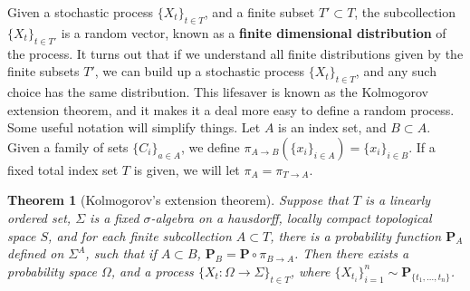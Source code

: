\documentclass[12pt]{report}
\theoremstyle{plain}
\newtheorem{theorem}{Theorem}[chapter]
\theoremstyle{definition}
\begin{document}
Given a stochastic process $\{X_t\}_{t \in T}$, and a finite subset $T' \subset T$, the subcollection $\{X_t\}_{t \in T'}$ is a random vector, known as a {\bf finite dimensional distribution} of the process. It turns out that if we understand all finite distributions given by the finite subsets $T'$, we can build up a stochastic process $\{X_t\}_{t \in T}$, and any such choice has the same distribution. This lifesaver is known as the Kolmogorov extension theorem, and it makes it a deal more easy to define a random process. Some useful notation will simplify things. Let $A$ is an index set, and $B \subset A$. Given a family of sets $\{ C_i \}_{a \in A}$, we define $\pi_{A \to B}(\{x_i\}_{i \in A}) = \{x_i\}_{i \in B}$. If a fixed total index set $T$ is given, we will let $\pi_A = \pi_{T \to A}$.

\begin{theorem}[Kolmogorov's extension theorem]
    Suppose that $T$ is a linearly ordered set, $\Sigma$ is a fixed $\sigma$-algebra on a hausdorff, locally compact topological space $S$, and for each finite subcollection $A \subset T$, there is a probability function $\mathbf{P}_{A}$ defined on $\Sigma^{A}$, such that if $A \subset B$, $\mathbf{P}_B = \mathbf{P} \circ \pi_{B \to A}$. Then there exists a probability space $\Omega$, and a process $\{X_t: \Omega \to \Sigma \}_{t \in T}$, where $\{ X_{t_i} \}_{i = 1}^n \sim \mathbf{P}_{\{ t_1, \dots, t_n \}}$.
\end{theorem}
\end{document}
